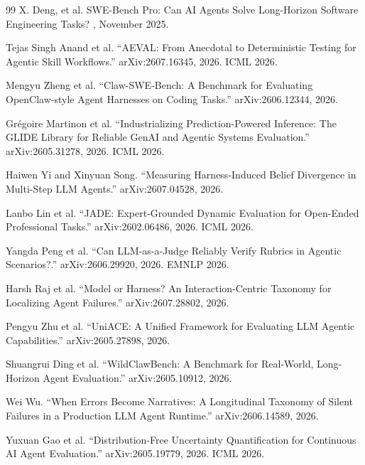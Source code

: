 \begin{thebibliography}{99}
X. Deng, et al.
\newblock SWE-Bench Pro: Can AI Agents Solve Long-Horizon Software Engineering Tasks?
, November 2025.


Tejas Singh Anand et al.
``AEVAL: From Anecdotal to Deterministic Testing for Agentic Skill Workflows.''
arXiv:2607.16345, 2026. ICML 2026.

Mengyu Zheng et al.
``Claw-SWE-Bench: A Benchmark for Evaluating OpenClaw-style Agent Harnesses on Coding Tasks.''
arXiv:2606.12344, 2026.

Grégoire Martinon et al.
``Industrializing Prediction-Powered Inference: The GLIDE Library for Reliable GenAI and Agentic Systems Evaluation.''
arXiv:2605.31278, 2026. ICML 2026.

Haiwen Yi and Xinyuan Song.
``Measuring Harness-Induced Belief Divergence in Multi-Step LLM Agents.''
arXiv:2607.04528, 2026.

Lanbo Lin et al.
``JADE: Expert-Grounded Dynamic Evaluation for Open-Ended Professional Tasks.''
arXiv:2602.06486, 2026. ICML 2026.

Yangda Peng et al.
``Can LLM-as-a-Judge Reliably Verify Rubrics in Agentic Scenarios?.''
arXiv:2606.29920, 2026. EMNLP 2026.

Harsh Raj et al.
``Model or Harness? An Interaction-Centric Taxonomy for Localizing Agent Failures.''
arXiv:2607.28802, 2026.

Pengyu Zhu et al.
``UniACE: A Unified Framework for Evaluating LLM Agentic Capabilities.''
arXiv:2605.27898, 2026.

Shuangrui Ding et al.
``WildClawBench: A Benchmark for Real-World, Long-Horizon Agent Evaluation.''
arXiv:2605.10912, 2026.

Wei Wu.
``When Errors Become Narratives: A Longitudinal Taxonomy of Silent Failures in a Production LLM Agent Runtime.''
arXiv:2606.14589, 2026.

Yuxuan Gao et al.
``Distribution-Free Uncertainty Quantification for Continuous AI Agent Evaluation.''
arXiv:2605.19779, 2026. ICML 2026.
\end{thebibliography}

